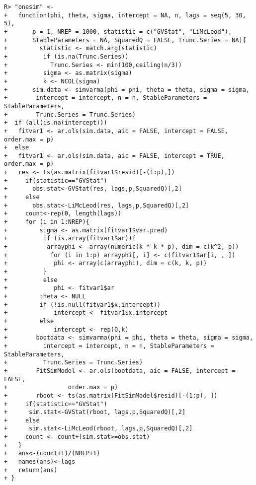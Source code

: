 \documentclass[article,nojss]{jss}
\begin{document}
\begin{verbatim}
R> "onesim" <-
+   function(phi, theta, sigma, intercept = NA, n, lags = seq(5, 30, 5),
+       p = 1, NREP = 1000, statistic = c("GVStat", "LiMcLeod"), 
+       StableParameters = NA, SquaredQ = FALSE, Trunc.Series = NA){
+         statistic <- match.arg(statistic)
+          if (is.na(Trunc.Series)) 
+            Trunc.Series <- min(100,ceiling(n/3))
+          sigma <- as.matrix(sigma)
+          k <- NCOL(sigma)
+       sim.data <- simvarma(phi = phi, theta = theta, sigma = sigma, 
+        intercept = intercept, n = n, StableParameters = StableParameters,
+        Trunc.Series = Trunc.Series) 
+  if (all(is.na(intercept)))
+   fitvar1 <- ar.ols(sim.data, aic = FALSE, intercept = FALSE, order.max = p)
+  else
+   fitvar1 <- ar.ols(sim.data, aic = FALSE, intercept = TRUE, order.max = p)
+   res <- ts(as.matrix(fitvar1$resid)[-(1:p),])
+     if(statistic=="GVStat")
+       obs.stat<-GVStat(res, lags,p,SquaredQ)[,2]
+     else
+       obs.stat<-LiMcLeod(res, lags,p,SquaredQ)[,2]
+     count<-rep(0, length(lags))
+     for (i in 1:NREP){
+         sigma <- as.matrix(fitvar1$var.pred)
+          if (is.array(fitvar1$ar)){
+           arrayphi <- array(numeric(k * k * p), dim = c(k^2, p))
+            for (i in 1:p) arrayphi[, i] <- c(fitvar1$ar[i, , ])
+             phi <- array(c(arrayphi), dim = c(k, k, p))
+          }
+          else
+             phi <- fitvar1$ar
+         theta <- NULL
+         if (!is.null(fitvar1$x.intercept)) 
+             intercept <- fitvar1$x.intercept
+         else
+             intercept <- rep(0,k)
+        bootdata <- simvarma(phi = phi, theta = theta, sigma = sigma, 
+          intercept = intercept, n = n, StableParameters = StableParameters, 
+          Trunc.Series = Trunc.Series)
+        FitSimModel <- ar.ols(bootdata, aic = FALSE, intercept = FALSE, 
+                 order.max = p)
+        rboot <- ts(as.matrix(FitSimModel$resid)[-(1:p), ])
+     if(statistic=="GVStat")
+      sim.stat<-GVStat(rboot, lags,p,SquaredQ)[,2]
+     else
+      sim.stat<-LiMcLeod(rboot, lags,p,SquaredQ)[,2]
+     count <- count+(sim.stat>=obs.stat)
+   }
+   ans<-(count+1)/(NREP+1)
+   names(ans)<-lags
+   return(ans)
+ }
\end{verbatim}
\end{document}
